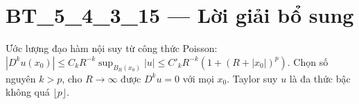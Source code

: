 \documentclass[10pt,a4paper]{article}
\begin{document}
\section*{BT\_5\_4\_3\_15 — Lời giải bổ sung}
Ước lượng đạo hàm nội suy từ công thức Poisson: $|D^ku(x_0)|\le C_kR^{-k}\sup_{B_R(x_0)}|u|\le C'_kR^{-k}(1+(R+|x_0|)^p)$. Chọn số nguyên $k>p$, cho $R\to\infty$ được $D^ku=0$ với mọi $x_0$. Taylor suy $u$ là đa thức bậc không quá $\lfloor p\rfloor$.
\end{document}
